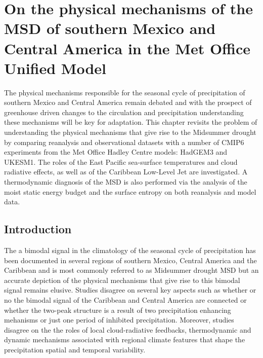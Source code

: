 
\chapter{\label{ch:5-msd}On the physical mechanisms of the MSD of southern Mexico and Central America in the Met Office Unified Model}


The physical mechanisms responsible for the seasonal cycle of precipitation of southern Mexico and Central America remain debated and with the prospect of greenhouse driven changes to the circulation and precipitation understanding these mechanisms will be key for adaptation. 
This chapter revisits the problem of understanding the physical mechanisms that give rise to the Midsummer drought by comparing reanalysis and observational datasets with a number of CMIP6 experiments from the Met Office Hadley Centre models: HadGEM3 and UKESM1. 
The roles of the East Pacific sea-surface temperatures and cloud radiative effects, as well as of the Caribbean Low-Level Jet are investigated. 
A thermodynamic diagnosis of the MSD is also performed via the analysis of the moist static energy budget and the surface entropy on both reanalysis and model data. 

\section{Introduction}

The a bimodal signal in the climatology of the seasonal cycle of precipitation has been documented in several regions of southern Mexico, Central America and the Caribbean and is most commonly referred to as Midsummer drought MSD \citep{mosino1966,magana1999,gamble2008,perdigon2018,zhao2020} but an accurate depiction of the physical mechanisms that give rise to this bimodal signal remains elusive. Studies disagree on several key aspects such as whether or no the bimodal signal of the Caribbean and Central America are connected or whether the two-peak structure is a result of two precipitation enhancing mehanisms or just one period of inhibited precipitation. Moreover, studies disagree on the the roles of local cloud-radiative feedbacks, thermodynamic and dynamic mechanisms associated with regional climate features that shape the precipitation spatial and temporal variability.



